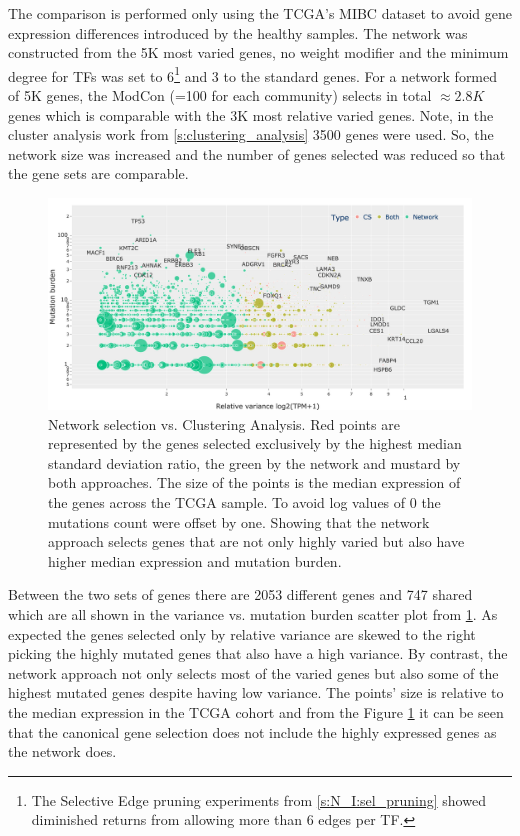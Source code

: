 The comparison is performed only using the TCGA's MIBC dataset to avoid gene expression differences introduced by the healthy samples. The network was constructed from the 5K most varied genes, no weight modifier and the minimum degree for TFs  was set to 6\footnote{The Selective Edge pruning experiments from \cref{s:N_I:sel_pruning} showed diminished returns from allowing more than 6 edges per TF.} and 3 to the standard genes. For a network formed of 5K genes, the ModCon (=100 for each community) selects in total $\approx2.8K$ genes which is comparable with the 3K most relative varied genes. Note, in the cluster analysis work from \cref{s:clustering_analysis} 3500 genes were used. So, the network size was increased and the number of genes selected was reduced so that the gene sets are comparable.

\begin{figure}[!t]    
    \centering\includegraphics[width=1.0\textwidth,keepaspectratio]{Sections/Network_I/Resources/Tum_network/ClusteringAnalysis_vs_Network_3.png}
    \caption{Network selection vs. Clustering Analysis. Red points are represented by the genes selected exclusively by the highest median standard deviation ratio, the green by the network and mustard by both approaches. The size of the points is the median expression of the genes across the TCGA sample. To avoid log values of 0 the mutations count were offset by one. Showing that the network approach selects genes that are not only highly varied but also have higher median expression and mutation burden.}
    \label{fig:N_I:network_ca_selection}
\end{figure}

Between the two sets of genes there are 2053 different genes and 747 shared which are all shown in the variance vs. mutation burden scatter plot from \cref{fig:N_I:network_ca_selection}. As expected the genes selected only by relative variance are skewed to the right picking the highly mutated genes that also have a high variance. By contrast, the network approach not only selects most of the varied genes but also some of the highest mutated genes despite having low variance. The points' size is relative to the median expression in the TCGA cohort and from the Figure \ref{fig:N_I:network_ca_selection} it can be seen that the canonical gene selection does not include the highly expressed genes as the network does.

